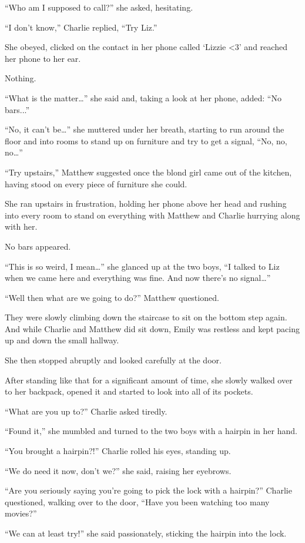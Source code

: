 “Who am I supposed to call?” she asked, hesitating.

“I don’t know,” Charlie replied, “Try Liz.”

She obeyed, clicked on the contact in her phone called ‘Lizzie <3’ and reached her phone to her ear.

Nothing.

“What is the matter…” she said and, taking a look at her phone, added: “No bars...”

“No, it can’t be…” she muttered under her breath, starting to run around the floor and into rooms to stand up on furniture and try to get a signal, “No, no, no…”

“Try upstairs,” Matthew suggested once the blond girl came out of the kitchen, having stood on every piece of furniture she could.

She ran upstairs in frustration, holding her phone above her head and rushing into every room to stand on everything with Matthew and Charlie hurrying along with her.

No bars appeared.

“This is so weird, I mean…” she glanced up at the two boys, “I talked to Liz when we came here and everything was fine. And now there’s no signal…”

“Well then what are we going to do?” Matthew questioned.

They were slowly climbing down the staircase to sit on the bottom step again. And while Charlie and Matthew did sit down, Emily was restless and kept pacing up and down the small hallway.

She then stopped abruptly and looked carefully at the door.

After standing like that for a significant amount of time, she slowly walked over to her backpack, opened it and started to look into all of its pockets.

“What are you up to?” Charlie asked tiredly.

“Found it,” she mumbled and turned to the two boys with a hairpin in her hand.

“You brought a hairpin?!” Charlie rolled his eyes, standing up.

“We do need it now, don’t we?” she said, raising her eyebrows.

“Are you seriously saying you’re going to pick the lock with a hairpin?” Charlie questioned, walking over to the door, “Have you been watching too many movies?”

“We can at least try!” she said passionately, sticking the hairpin into the lock.

